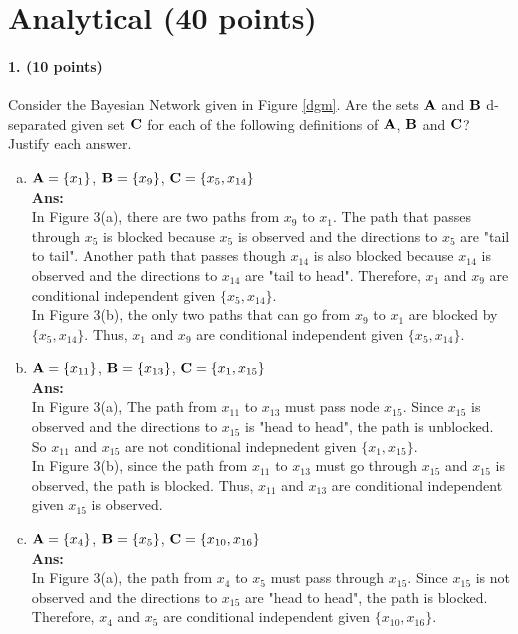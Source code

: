 \documentclass[11pt]{article}
\begin{document}
\section{Analytical (40 points)}
\paragraph{1. (10 points)} Consider the Bayesian Network given in Figure \ref{dgm}. Are the sets ${\bf A}$ and ${\bf B}$ d-separated given set ${\bf C}$ for each of the following definitions of ${\bf A}$, ${\bf B}$ and ${\bf C}$? Justify each answer.
\begin{enumerate}[a.]
\item ${\bf A} = \{x_1\}$, ${\bf B} = \{x_9\}$, ${\bf C} = \{x_5,x_{14}\}$\\
\textbf{Ans:}\\
In Figure 3(a), there are two paths from $x_9$ to $x_1$. The path that passes through $x_5$ is blocked because $x_5$ is observed and the directions to $x_5$ are "tail to tail". Another path that passes though $x_{14}$ is also blocked because $x_14$ is observed and the directions to $x_14$ are "tail to head". Therefore, $x_1$ and $x_9$ are conditional independent given $\{x_5,x_{14}\}$.\\

In Figure 3(b), the only two paths that can go from $x_9$ to $x_1$ are blocked by $\{x_5,x_{14}\}$. Thus, $x_1$ and $x_9$ are conditional independent given $\{x_5,x_{14}\}$.
%
\item ${\bf A} = \{x_{11}\}$, ${\bf B} = \{x_{13}\}$, ${\bf C} = \{x_1,x_{15}\}$\\
\textbf{Ans:}\\
In Figure 3(a), The path from $x_{11}$ to $x_{13}$ must pass node $x_{15}$. Since $x_{15}$ is observed and the directions to $x_{15}$ is "head to head", the path is unblocked. So $x_{11}$ and $x_{15}$ are not conditional indepnedent given $\{x_1,x_{15}\}$.\\

In Figure 3(b), since the path from $x_{11}$ to $x_{13}$ must go through $x_{15}$ and $x_{15}$ is observed, the path is blocked. Thus, $x_{11}$ and $x_{13}$ are conditional independent given $x_{15}$ is observed.
%
\item ${\bf A} = \{x_4\}$, ${\bf B} = \{x_5\}$, ${\bf C} = \{x_{10},x_{16}\}$\\
\textbf{Ans:}\\
In Figure 3(a), the path from $x_4$ to $x_5$ must pass through $x_15$. Since $x_{15}$ is not observed and the directions to $x_{15}$ are "head to head", the path is blocked. Therefore, $x_4$ and $x_5$ are conditional independent given $\{x_{10},x_{16}\}$.\\


\end{enumerate}
\end{document}
